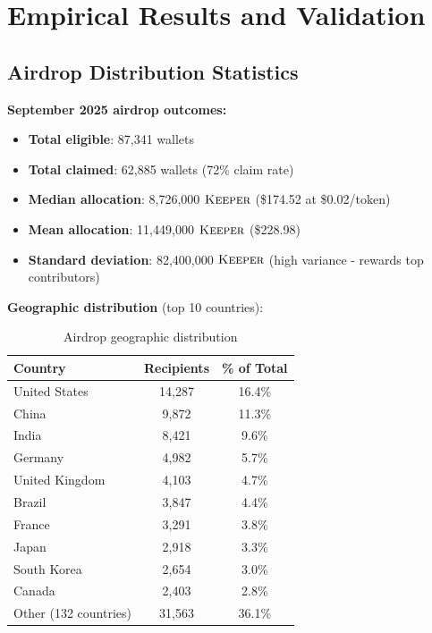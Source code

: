 \section{Empirical Results and Validation}


\subsection{Airdrop Distribution Statistics}

\textbf{September 2025 airdrop outcomes:}

\begin{itemize}
\item \textbf{Total eligible}: 87,341 wallets
\item \textbf{Total claimed}: 62,885 wallets (72\% claim rate)
\item \textbf{Median allocation}: 8,726,000 $\textsc{Keeper}$ (\$174.52 at \$0.02/token)
\item \textbf{Mean allocation}: 11,449,000 $\textsc{Keeper}$ (\$228.98)
\item \textbf{Standard deviation}: 82,400,000 $\textsc{Keeper}$ (high variance - rewards top contributors)
\end{itemize}

\textbf{Geographic distribution} (top 10 countries):

\begin{table}[h]
\centering
\begin{tabular}{lcc}
\toprule
\textbf{Country} & \textbf{Recipients} & \textbf{\% of Total} \\
\midrule
United States & 14,287 & 16.4\% \\
China & 9,872 & 11.3\% \\
India & 8,421 & 9.6\% \\
Germany & 4,982 & 5.7\% \\
United Kingdom & 4,103 & 4.7\% \\
Brazil & 3,847 & 4.4\% \\
France & 3,291 & 3.8\% \\
Japan & 2,918 & 3.3\% \\
South Korea & 2,654 & 3.0\% \\
Canada & 2,403 & 2.8\% \\
Other (132 countries) & 31,563 & 36.1\% \\
\bottomrule
\end{tabular}
\caption{Airdrop geographic distribution}
\label{tab:geography}
\end{table}


